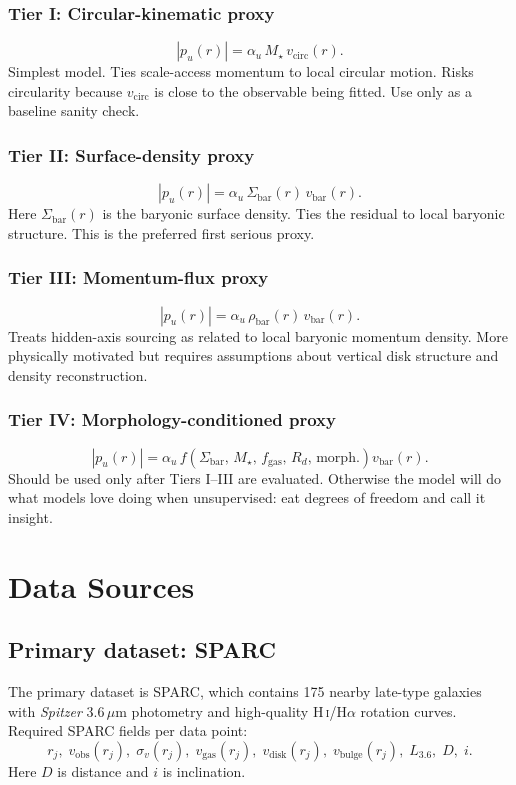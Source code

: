 \documentclass[11pt,a4paper,oneside]{article}
\newcommand{\vobs}{v_{\mathrm{obs}}}
\newcommand{\vbar}{v_{\mathrm{bar}}}
\newcommand{\vgas}{v_{\mathrm{gas}}}
\newcommand{\vdisk}{v_{\mathrm{disk}}}
\newcommand{\vbulge}{v_{\mathrm{bulge}}}
\newcommand{\vcirc}{v_{\mathrm{circ}}}
\newcommand{\pu}{p_u}
\newcommand{\Sbar}{\Sigma_{\mathrm{bar}}}
\newcommand{\rhobar}{\rho_{\mathrm{bar}}}
\newcommand{\Mstar}{M_{\star}}
\newcommand{\fgas}{f_{\mathrm{gas}}}
\newcommand{\Rd}{R_d}
\begin{document}
\subsubsection*{Tier I: Circular-kinematic proxy}
\[
    |\pu(r)| = \alpha_u\,\Mstar\,\vcirc(r).
\]
Simplest model. Ties scale-access momentum to local circular motion. Risks circularity
because $\vcirc$ is close to the observable being fitted. Use only as a baseline
sanity check.

\subsubsection*{Tier II: Surface-density proxy}
\[
    |\pu(r)| = \alpha_u\,\Sbar(r)\,\vbar(r).
\]
Here $\Sbar(r)$ is the baryonic surface density. Ties the residual to local baryonic
structure. This is the preferred first serious proxy.

\subsubsection*{Tier III: Momentum-flux proxy}
\[
    |\pu(r)| = \alpha_u\,\rhobar(r)\,\vbar(r).
\]
Treats hidden-axis sourcing as related to local baryonic momentum density. More
physically motivated but requires assumptions about vertical disk structure and
density reconstruction.

\subsubsection*{Tier IV: Morphology-conditioned proxy}
\[
    |\pu(r)| = \alpha_u\,f\!\left(\Sbar,\,\Mstar,\,\fgas,\,\Rd,\,\mathrm{morph.}\right)
    \vbar(r).
\]
Should be used only after Tiers I--III are evaluated. Otherwise the model will do what
models love doing when unsupervised: eat degrees of freedom and call it insight.

\section{Data Sources}

\subsection{Primary dataset: SPARC}

The primary dataset is SPARC, which contains 175 nearby late-type galaxies with
\emph{Spitzer} 3.6\,$\mu$m photometry and high-quality H\,\textsc{i}/H$\alpha$
rotation curves. Required SPARC fields per data point:
\[
    r_j,\;\vobs(r_j),\;\sigma_v(r_j),\;\vgas(r_j),\;\vdisk(r_j),\;\vbulge(r_j),
    \;L_{3.6},\;D,\;i.
\]
Here $D$ is distance and $i$ is inclination.
\end{document}
